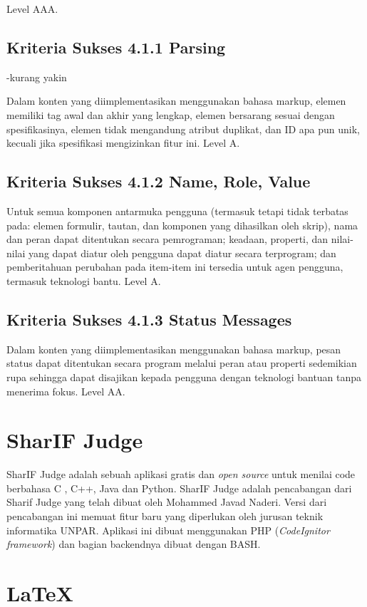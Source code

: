 Level AAA.

\subsection{Kriteria Sukses 4.1.1 Parsing}
\label{sec:kriteria_4.1.1}
-kurang yakin

Dalam konten yang diimplementasikan menggunakan bahasa markup, elemen memiliki tag awal dan akhir yang lengkap, elemen bersarang sesuai dengan spesifikasinya, elemen tidak mengandung atribut duplikat, dan ID apa pun unik, kecuali jika spesifikasi mengizinkan fitur ini.
Level A.

\subsection{Kriteria Sukses 4.1.2 Name, Role, Value}
\label{sec:kriteria_4.1.2}
Untuk semua komponen antarmuka pengguna (termasuk tetapi tidak terbatas pada: elemen formulir, tautan, dan komponen yang dihasilkan oleh skrip), nama dan peran dapat ditentukan secara pemrograman; keadaan, properti, dan nilai-nilai yang dapat diatur oleh pengguna dapat diatur secara terprogram; dan pemberitahuan perubahan pada item-item ini tersedia untuk agen pengguna, termasuk teknologi bantu.
Level A.

\subsection{Kriteria Sukses 4.1.3 Status Messages}
\label{sec:kriteria_4.1.3}
Dalam konten yang diimplementasikan menggunakan bahasa markup, pesan status dapat ditentukan secara program melalui peran atau properti sedemikian rupa sehingga dapat disajikan kepada pengguna dengan teknologi bantuan tanpa menerima fokus.
Level AA.

\section{SharIF Judge}
SharIF Judge adalah sebuah aplikasi gratis dan \textit{open source} untuk menilai code berbahasa C , C++, Java dan Python. SharIF Judge adalah pencabangan dari Sharif Judge yang telah dibuat oleh Mohammed Javad Naderi. Versi dari pencabangan ini memuat fitur baru yang diperlukan oleh jurusan teknik informatika UNPAR. Aplikasi ini dibuat menggunakan PHP (\textit{CodeIgnitor framework}) dan bagian backendnya dibuat dengan BASH.

\section{\LaTeX}
\label{sec:latex}

